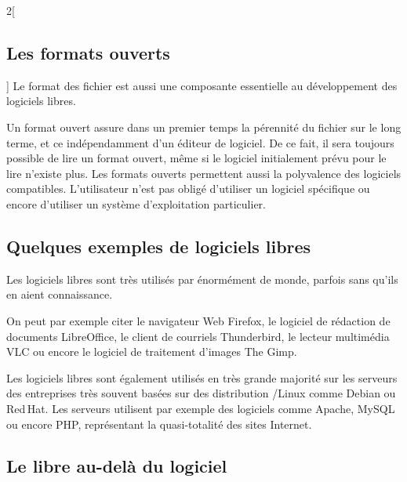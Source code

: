 \begin{multicols}{2}[\subsection{Les formats ouverts}]
Le format des fichier est aussi une composante essentielle au développement des logiciels libres.

Un \textcolor{Cdl}{format ouvert} assure dans un premier temps la pérennité du fichier sur le long terme, et ce indépendamment d’un éditeur de logiciel. De ce fait, il sera toujours possible de lire un format ouvert, même si le logiciel initialement prévu pour le lire n’existe plus. Les formats ouverts permettent aussi la polyvalence des logiciels compatibles. L’utilisateur n’est pas obligé d’utiliser un logiciel spécifique ou encore d’utiliser un système d’exploitation particulier.
\end{multicols}

\subsection{Quelques exemples de logiciels libres}


Les logiciels libres sont très utilisés par énormément de monde, parfois 
sans qu’ils en aient connaissance.

On peut par exemple citer le navigateur Web \textcolor{Cdl}{Firefox}, 
le logiciel de rédaction de documents \textcolor{Cdl}{LibreOffice}, le 
client de courriels \textcolor{Cdl}{Thunderbird}, le lecteur 
multimédia \textcolor{Cdl}{VLC} ou encore le logiciel de traitement 
d’images \textcolor{Cdl}{The Gimp}.

\Separateur

Les logiciels libres sont également utilisés en très grande majorité sur 
les serveurs des entreprises très souvent basées sur des distribution 
/Linux comme \textcolor{Cdl}{Debian} ou 
\textcolor{Cdl}{Red\,Hat}. Les serveurs utilisent par exemple des 
logiciels comme \textcolor{Cdl}{Apache}, \textcolor{Cdl}{MySQL} ou 
encore \textcolor{Cdl}{PHP}, représentant la quasi-totalité des sites 
Internet.

\subsection{Le libre au-delà du logiciel}

